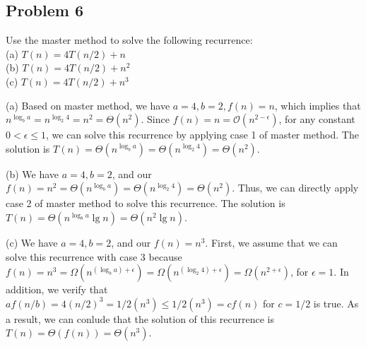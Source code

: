 \documentclass[a4paper]{article}
\makeatletter
\newenvironment{solution}
  {\begin{proof}[Solution]}
  {\end{proof}}
\renewenvironment{proof}[1][\proofname]{%
  \par\pushQED{\qed}\normalfont%
  \topsep6\p@\@plus6\p@\relax
  \trivlist\item[\hskip\labelsep\bfseries#1\@addpunct{.}]%
  \ignorespaces
}{%
  \popQED\endtrivlist\@endpefalse
}
\makeatother
\begin{document}
\subsection*{Problem 6}
Use the master method to solve the following recurrence: \\
(a) $T(n)=4T(n/2)+n$ \\
(b) $T(n)=4T(n/2)+n^2$ \\
(c) $T(n)=4T(n/2)+n^3$
\begin{solution}
  (a) Based on master method, we have $a = 4, b = 2, f(n) = n$, which implies that $n^{\log_{b}a} = n^{\log_{2}4} = n^2 = \Theta(n^2)$. Since $f(n) = n = \mathcal{O}(n^{2-\epsilon})$, for any constant $0 < \epsilon \le 1$, we can solve this recurrence by applying case 1 of master method. The solution is $T(n) = \Theta(n^{\log_{b}a}) = \Theta(n^{\log_{2}4}) = \Theta(n^2)$.
\end{solution}

\begin{solution}
  (b) We have $a = 4, b = 2$, and our $f(n) = n^2 = \Theta(n^{\log_{b}a}) = \Theta(n^{\log_{2}4}) = \Theta(n^2)$. Thus, we can directly apply case 2 of master method to solve this recurrence. The solution is $T(n) = \Theta(n^{\log_{b}a}\lg n) = \Theta(n^2\lg n)$.
\end{solution}

\begin{solution}
  (c) We have $a = 4, b = 2$, and our $f(n) = n^3$. First, we assume that we can solve this recurrence with case 3 because $f(n) = n^3 = \Omega(n^{(\log_{b}a) + \epsilon}) = \Omega(n^{(\log_{2}4) + \epsilon}) = \Omega(n^{2 + \epsilon})$, for $\epsilon = 1$. In addition, we verify that $af(n/b) = 4(n/2)^3 = 1/2(n^3) \le 1/2(n^3) = cf(n)$ for $c = 1/2$ is true. As a result, we can conlude that the solution of this recurrence is $T(n) = \Theta(f(n)) = \Theta(n^3)$.
\end{solution}
\end{document}
